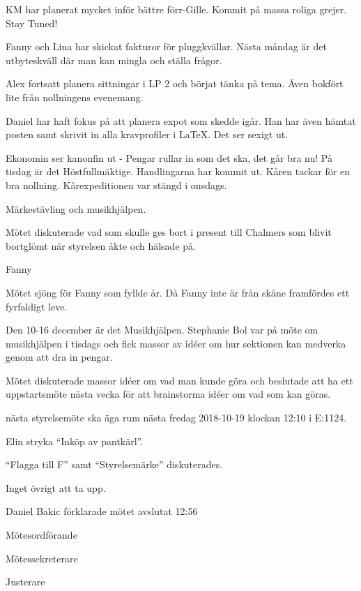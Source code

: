 \documentclass[10pt]{article}
\def\mo{Daniel Bakic}
\def\ms{Magnus Lundh}
\def\ji{Isabella Hansen}
\begin{document}
\begin{paragrafer}
\begin{paragrafer}
		KM har planerat mycket inför bättre förr-Gille. Kommit på massa roliga grejer. Stay Tuned!
		
		Fanny och Lina har skickat fakturor för pluggkvällar. Nästa måndag är det utbyteskväll där man kan mingla och ställa frågor.
		
		Alex fortsatt planera sittningar i LP 2 och börjat tänka på tema. Även bokfört lite från nollningens evenemang.
		
		Daniel har haft fokus på att planera expot som skedde igår. Han har även hämtat posten samt skrivit in
		alla kravprofiler i \LaTeX. Det ser sexigt ut.

		Ekonomin ser kanonfin ut - Pengar rullar in som det ska, det går bra nu!
		På tisdag är det Höstfullmäktige. Handlingarna har kommit ut. Kåren tackar för en bra nollning. Kårexpeditionen var stängd i onsdags.



		Märkestävling och musikhjälpen.

	\end{paragrafer}

	Mötet diskuterade vad som skulle ges bort i present till Chalmers som blivit bortglömt när styrelsen åkte och hälsade på.
	
	Fanny 

	\Mbaby

	Mötet sjöng för Fanny som fyllde år. Då Fanny inte är från skåne framfördes ett fyrfaldigt leve.

	Den 10-16 december är det Musikhjälpen.
	Stephanie Bol var på möte om musikhjälpen i tisdags och fick massor av idéer om hur sektionen kan medverka genom att dra in pengar.

	Mötet diskuterade massor idéer om vad man kunde göra och beslutade att ha ett uppstartsmöte nästa vecka för att brainstorma idéer om vad som kan göras.


	\Mba nästa styrelsemöte ska äga rum nästa fredag 2018-10-19 klockan 12:10 i E:1124.


	Elin \ypa stryka ``Inköp av pantkärl''.

	\Mbaby

	``Flagga till F'' samt ``Styrelsemärke'' diskuterades.



	Inget övrigt att ta upp.

	{\mo} förklarade mötet avslutat 12:56
\end{paragrafer}

\hidesignfoot
\begin{signatures}{3}
	\signature{\mo}{Mötesordförande}
	\signature{\ms}{Mötessekreterare}
	\signature{\ji}{Justerare}
\end{signatures}
\end{document}
